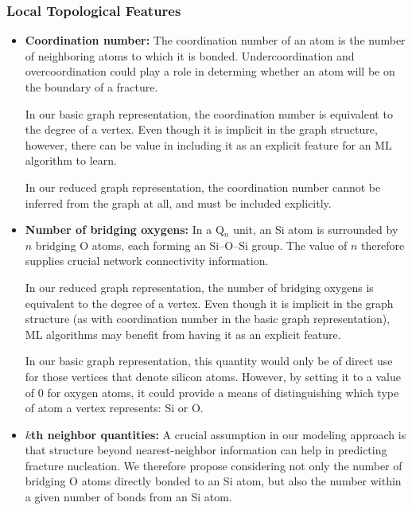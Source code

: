 \subsubsection{Local Topological Features}

\begin{itemize}
    \item \textbf{Coordination number:} The coordination number of an atom is the number of neighboring atoms to which it is bonded.  Undercoordination and overcoordination could play a role in determing whether an atom will be on the boundary of a fracture.
    
    In our basic graph representation, the coordination number is equivalent to the degree of a vertex.  Even though it is implicit in the graph structure, however, there can be value in including it as an explicit feature for an ML algorithm to learn.
    
    In our reduced graph representation, the coordination number cannot be inferred from the graph at all, and must be included explicitly.

    \item\textbf{Number of bridging oxygens:} In a Q$_n$ unit, an Si atom is surrounded by $n$ bridging O atoms, each forming an Si--O--Si group.  The value of $n$ therefore supplies crucial network connectivity information. 
    
    In our reduced graph representation, the number of bridging oxygens is equivalent to the degree of a vertex.  Even though it is implicit in the graph structure (as with coordination number in the basic graph representation), ML algorithms may benefit from having it as an explicit feature.
    
    In our basic graph representation, this quantity would only be of direct use for those vertices that denote silicon atoms.  However, by setting it to a value of 0 for oxygen atoms, it could provide a means of distinguishing which type of atom a vertex represents: Si or O.

    \item\textbf{$k$th neighbor quantities:} A crucial assumption in our modeling approach is that structure beyond nearest-neighbor information can help in predicting fracture nucleation.  We therefore propose considering not only the number of bridging O atoms directly bonded to an Si atom, but also the number within a given number of bonds from an Si atom.
    

\end{itemize}
